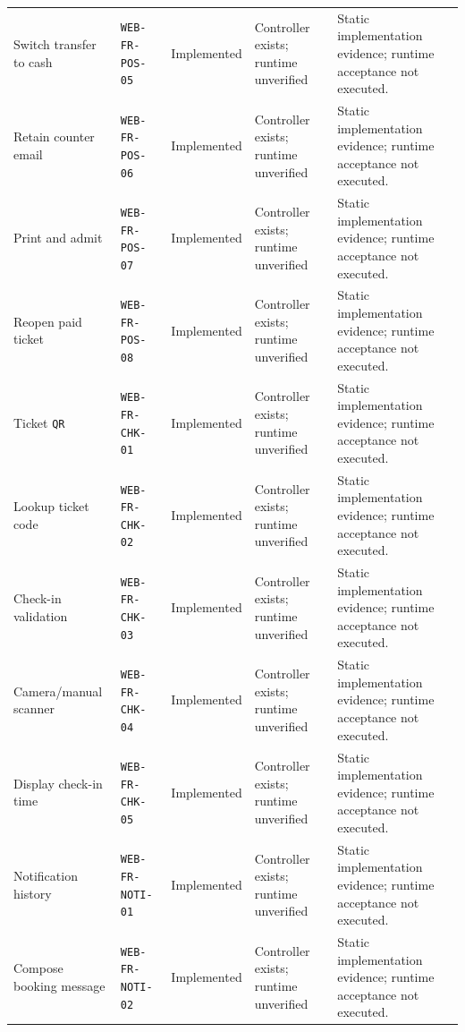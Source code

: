 \begin{longtable}{@{}P{0.19000\SRSWidth}P{0.18000\SRSWidth}P{0.15000\SRSWidth}P{0.20000\SRSWidth}P{0.28000\SRSWidth}@{}}
Switch transfer to cash & \texttt{WEB-\allowbreak{}FR-\allowbreak{}POS-\allowbreak{}05} & Implemented & Controller exists; runtime unverified & Static implementation evidence; runtime acceptance not executed. \\[3pt]
Retain counter email & \texttt{WEB-\allowbreak{}FR-\allowbreak{}POS-\allowbreak{}06} & Implemented & Controller exists; runtime unverified & Static implementation evidence; runtime acceptance not executed. \\[3pt]
Print and admit & \texttt{WEB-\allowbreak{}FR-\allowbreak{}POS-\allowbreak{}07} & Implemented & Controller exists; runtime unverified & Static implementation evidence; runtime acceptance not executed. \\[3pt]
Reopen paid ticket & \texttt{WEB-\allowbreak{}FR-\allowbreak{}POS-\allowbreak{}08} & Implemented & Controller exists; runtime unverified & Static implementation evidence; runtime acceptance not executed. \\[3pt]
Ticket \texttt{QR} & \texttt{WEB-\allowbreak{}FR-\allowbreak{}CHK-\allowbreak{}01} & Implemented & Controller exists; runtime unverified & Static implementation evidence; runtime acceptance not executed. \\[3pt]
Lookup ticket code & \texttt{WEB-\allowbreak{}FR-\allowbreak{}CHK-\allowbreak{}02} & Implemented & Controller exists; runtime unverified & Static implementation evidence; runtime acceptance not executed. \\[3pt]
Check-in validation & \texttt{WEB-\allowbreak{}FR-\allowbreak{}CHK-\allowbreak{}03} & Implemented & Controller exists; runtime unverified & Static implementation evidence; runtime acceptance not executed. \\[3pt]
Camera/\allowbreak{}manual scanner & \texttt{WEB-\allowbreak{}FR-\allowbreak{}CHK-\allowbreak{}04} & Implemented & Controller exists; runtime unverified & Static implementation evidence; runtime acceptance not executed. \\[3pt]
Display check-in time & \texttt{WEB-\allowbreak{}FR-\allowbreak{}CHK-\allowbreak{}05} & Implemented & Controller exists; runtime unverified & Static implementation evidence; runtime acceptance not executed. \\[3pt]
Notification history & \texttt{WEB-\allowbreak{}FR-\allowbreak{}NOTI-\allowbreak{}01} & Implemented & Controller exists; runtime unverified & Static implementation evidence; runtime acceptance not executed. \\[3pt]
Compose booking message & \texttt{WEB-\allowbreak{}FR-\allowbreak{}NOTI-\allowbreak{}02} & Implemented & Controller exists; runtime unverified & Static implementation evidence; runtime acceptance not executed. \\[3pt]

\end{longtable}
